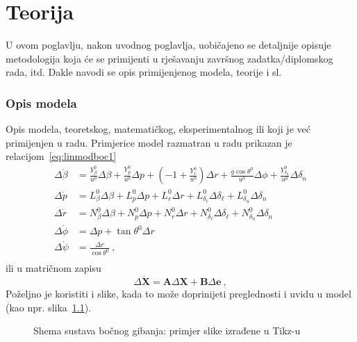 \chapter{Teorija}

U ovom poglavlju, nakon uvodnog poglavlja, uobičajeno se detaljnije opisuje
metodologija koja će se primijenti u rješavanju završnog zadatka/diplomskog
rada, itd. Dakle navodi se opis primijenjenog modela, teorije i sl.

\subsection{Opis modela}
Opis modela, teoretskog, matematičkog, eksperimentalnog ili koji je već
primijenjen u radu. Primjerice model razmatran u radu prikazan je relacijom~\eqref{eq:linmodboc1}
\begin{equation}\label{eq:linmodboc1}
\begin{aligned}
  \Delta \dot \beta  &= \frac{{Y_\beta ^0 }}
{{u^0 }}\Delta \beta  + \frac{{Y_p^0 }}
{{u^0 }}\Delta p + \left( { - 1 + \frac{{Y_r^0 }}
{{u^0 }}} \right)\Delta r + \frac{{g\cos \theta ^0 }}
{{u^0 }}\Delta \phi  + \frac{{Y_{\delta _n }^0 }}
{{u^0 }}\Delta \delta _n   \\
  \Delta \dot p &= L_\beta ^0 \Delta \beta  + L_p^0 \Delta p + L_r^0 \Delta r + L_{\delta _\ell  }^0 \Delta \delta _\ell   + L_{\delta _n }^0 \Delta \delta _n   \\
  \Delta \dot r &= N_\beta ^0 \Delta \beta  + N_p^0 \Delta p + N_r^0 \Delta r + N_{\delta _\ell  }^0 \Delta \delta _\ell   + N_{\delta _n }^0 \Delta \delta _n   \\
  \Delta \dot \phi  &= \Delta p + \tan \theta ^0 \Delta r  \\
  \Delta \dot \psi  &= \frac{{\Delta r}}
{{\cos \theta ^0 }} \:, \\ 
\end{aligned} 
\end{equation}
ili u matričnom zapisu
\begin{equation} 
\Delta \mathbf{\dot{X}} = {\mathbf{A}}\Delta {\mathbf{X}} +
{\mathbf{B}\Delta\mathbf{e}}\:,
\end{equation} 
Poželjno je koristiti i slike, kada to može doprinijeti preglednosti i uvidu u model (kao
npr. slika~\ref{fig:bocgib}). 
%
\begin{figure}[!h]
	\centering
{}
	\caption{Shema sustava bočnog gibanja: primjer slike izrađene u Tikz-u}
	\label{fig:bocgib}
\end{figure}
